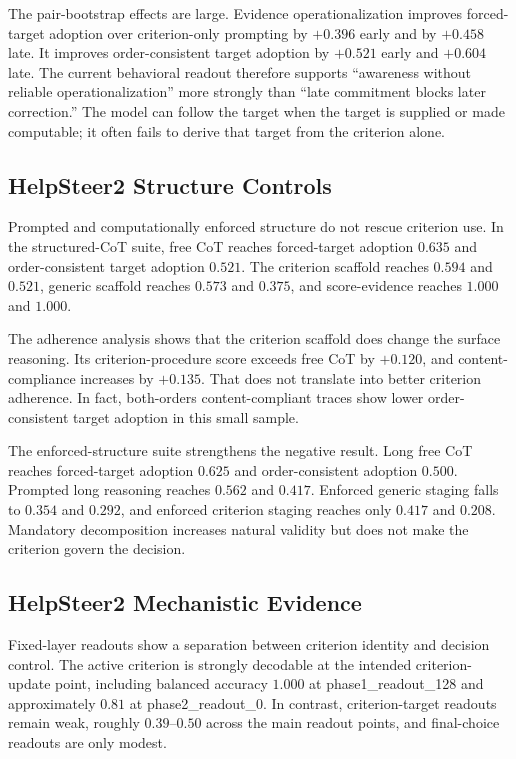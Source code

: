 \documentclass[11pt]{article}
\begin{document}
The pair-bootstrap effects are large. Evidence operationalization improves
forced-target adoption over criterion-only prompting by $+0.396$ early and
by $+0.458$ late. It improves order-consistent target adoption by $+0.521$ early
and $+0.604$ late. The current behavioral readout therefore supports
``awareness without reliable operationalization'' more strongly than
``late commitment blocks later correction.'' The model can follow the target
when the target is supplied or made computable; it often fails to derive that
target from the criterion alone.

\subsection{HelpSteer2 Structure Controls}

Prompted and computationally enforced structure do not rescue criterion use.
In the structured-CoT suite, free CoT reaches forced-target adoption $0.635$
and order-consistent target adoption $0.521$. The criterion scaffold reaches
$0.594$ and $0.521$, generic scaffold reaches $0.573$ and $0.375$, and
score-evidence reaches $1.000$ and $1.000$.

The adherence analysis shows that the criterion scaffold does change the
surface reasoning. Its criterion-procedure score exceeds free CoT by $+0.120$,
and content-compliance increases by $+0.135$. That does not translate into
better criterion adherence. In fact, both-orders content-compliant traces show
lower order-consistent target adoption in this small sample.

The enforced-structure suite strengthens the negative result. Long free CoT
reaches forced-target adoption $0.625$ and order-consistent adoption $0.500$.
Prompted long reasoning reaches $0.562$ and $0.417$. Enforced generic staging
falls to $0.354$ and $0.292$, and enforced criterion staging reaches only
$0.417$ and $0.208$. Mandatory decomposition increases natural validity but
does not make the criterion govern the decision.

\subsection{HelpSteer2 Mechanistic Evidence}

Fixed-layer readouts show a separation between criterion identity and decision
control. The active criterion is strongly decodable at the intended
criterion-update point, including balanced accuracy $1.000$ at
phase1\_readout\_128 and approximately $0.81$ at phase2\_readout\_0. In
contrast, criterion-target readouts remain weak, roughly $0.39$--$0.50$ across
the main readout points, and final-choice readouts are only modest.
\end{document}
